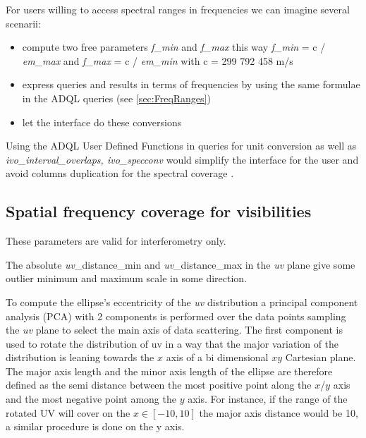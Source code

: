 \documentclass[11pt,a4paper]{ivoa}
\begin{document}
For users willing to access spectral ranges in frequencies we can imagine several scenarii:
\begin{itemize}
	\item compute two free parameters \emph{f\_min} and \emph{f\_max} this way \emph{f\_min} = c / \emph{em\_max} and \emph{f\_max} = c / \emph{em\_min} with c = 299 792 458 m/s
	\item express queries and results in terms of frequencies by using the same  formulae in the ADQL queries (see \ref{sec:FreqRanges})
	\item let the interface do these conversions 	
\end{itemize}

Using the ADQL User Defined Functions \citep{2024ivoa.spec.1107C} in queries for unit conversion as well as \emph{ivo\_interval\_overlaps, ivo\_specconv} would simplify the interface for the user and avoid  columns duplication for the spectral coverage . 


\subsection{Spatial frequency coverage for visibilities  }
These parameters are valid for interferometry only.

The absolute \emph{uv}\_distance\_min and \emph{uv}\_distance\_max  in the \emph{uv} plane give some outlier minimum and maximum scale in some direction.

To compute the ellipse's eccentricity of the \emph{uv} distribution a principal component analysis
(PCA) with 2 components is performed over the data points sampling the \emph{uv} plane to select the
main axis of data scattering. 
The first component is used to rotate the distribution of uv in a way that the major variation
of the distribution is leaning towards the $x$ axis of a bi dimensional $xy$ Cartesian plane.
The major axis length and the minor axis length of the ellipse are therefore defined as the
semi distance between the most positive point along the $x$/$y$ axis and the most negative point
among the $y$ axis. For instance, if the range of the rotated UV will cover on the $x \in [-10,
10]$ the major axis distance would be 10, a similar procedure is done on the y axis.
\end{document}
